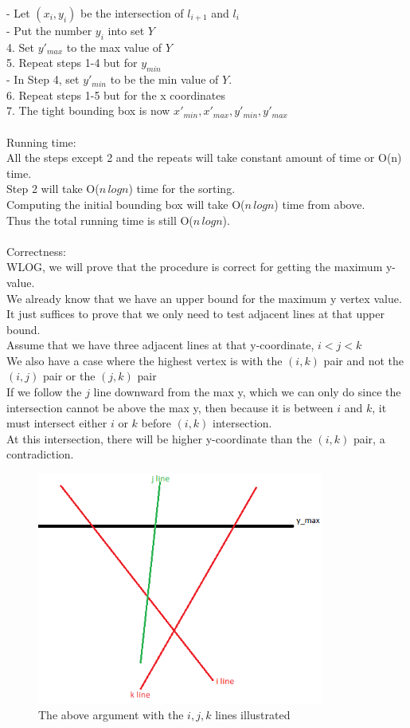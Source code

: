 \documentclass[11pt,psfig]{article}
\begin{document}
- Let $(x_i,y_i)$ be the intersection of $l_{i+1}$ and $l_i$\\
- Put the number $y_i$ into set $Y$\\
4. Set $y'_{max}$ to the max value of $Y$\\
5. Repeat steps 1-4 but for $y_{min}$ \\
- In Step 4, set $y'_{min}$ to be the min value of $Y$. \\
6. Repeat steps 1-5 but for the x coordinates\\
7. The tight bounding box is now $x'_{min}, x'_{max}, y'_{min}, y'_{max}$\\
\\
Running time:\\
All the steps except 2 and the repeats will take constant amount of time or O(n) time. \\
Step 2 will take O($n \, log n$) time for the sorting. \\
Computing the initial bounding box will take O($n \, log n$) time from above. \\
Thus the total running time is still O($n \, log n$). \\
\\
Correctness:
\\
WLOG, we will prove that the procedure is correct for getting the maximum y-value. \\
We already know that we have an upper bound for the maximum y vertex value. \\
It just suffices to prove that we only need to test adjacent lines at that upper bound. \\
Assume that we have three adjacent lines at that y-coordinate, $i < j < k$\\
We also have a case where the highest vertex is with the $(i,k)$ pair and not the $(i,j)$ pair or the $(j,k)$ pair \\
If we follow the $j$ line downward from the max y, which we can only do since the intersection cannot be above the max y, then because it is between $i$ and $k$, it must intersect either $i$ or $k$ before $(i,k)$ intersection. \\
At this intersection, there will be higher y-coordinate than the $(i,k)$ pair, a contradiction. 

\begin{figure}[H]
\centering
\includegraphics[height=3in]{hw2prob8_4_diagram.png}
\caption{The above argument with the $i,j,k$ lines illustrated}
\end{figure} 
\end{document}
